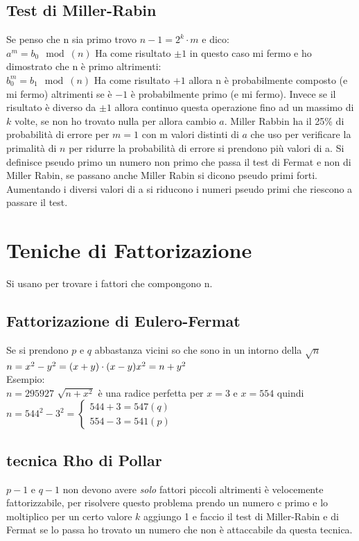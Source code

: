 \documentclass[10pt,a4paper]{article}
\begin{document}
\subsection{Test di Miller-Rabin}
Se penso che n sia primo trovo $n-1=2^k\cdot m$ e dico:\\
$a^m=b_0 \mod(n)$ Ha come risultato $ \pm 1$ in questo caso mi fermo e ho dimostrato che n è primo altrimenti:\\
$b_0^m=b_1 \mod(n)$ Ha come risultato $+1$ allora n è probabilmente composto (e mi fermo) altrimenti se è $-1$ è probabilmente primo (e mi fermo). Invece se il risultato è diverso da $\pm 1$ allora continuo questa operazione fino ad un massimo di $k$ volte, se non ho trovato nulla per allora cambio $a$. Miller Rabbin ha il 25\% di probabilità di errore per $m=1$ con m valori distinti di $a$ che uso per verificare la primalità di $n$ per ridurre la probabilità di errore si prendono più valori di a. Si definisce pseudo primo un numero non primo che passa il test di Fermat e non di Miller Rabin, se passano anche Miller Rabin si dicono pseudo primi forti. Aumentando i diversi valori di a si riducono i numeri pseudo primi che riescono a passare il test.
\section{Teniche di Fattorizazione}
Si usano per trovare i fattori che compongono n.
\subsection{Fattorizazione di Eulero-Fermat}
Se si prendono $p$ e $q$ abbastanza vicini so che sono in un intorno della $\sqrt{n}$
$n=x^2-y^2=(x+y)\cdot(x-y)\\x^2=n+y^2$\\
Esempio:\\
$n=295927$ $\sqrt{n+x^2}$ è una radice perfetta per $x=3$ e $x=554$ quindi\\
$n=544^2-3^2=\begin{cases}
544+3 = 547 (q)\\
554-3 = 541 (p)
\end{cases}
$
\subsection{tecnica Rho di Pollar}
$p-1$ e $q-1$ non devono avere \textit{solo} fattori piccoli altrimenti è velocemente fattorizzabile, per risolvere questo problema prendo un numero c primo e lo moltiplico per un certo valore $k$ aggiungo 1 e faccio il test di Miller-Rabin e di Fermat se lo passa ho trovato un numero che non è attaccabile da questa tecnica.
\end{document}
